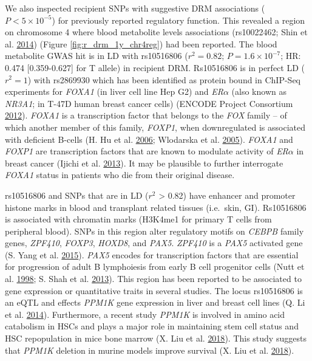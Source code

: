 \documentclass[]{DissertateOSU}
\begin{document}
We also inspected recipient SNPs with suggestive DRM associations
(\(P < 5\times{10}^{-5}\)) for previously reported regulatory function.
This revealed a region on chromosome 4 where blood metabolite levels
associations (rs10022462; Shin et al.
\protect\hyperlink{ref-shin_2014}{2014}) (Figure
\ref{fig:r_drm_1y_chr4reg}) had been reported. The blood metabolite GWAS
hit is in LD with rs10516806 (\(r^{2} = 0.82\);
\(P=1.6\times{10}^{-7}\); HR: 0.474 {[}0.359-0.627{]} for T allele) in
recipient DRM. Rs10516806 is in perfect LD (\(r^2=1\)) with rs2869930
which has been identified as protein bound in ChIP-Seq experiments for
\emph{FOXA1} (in liver cell line Hep G2) and \textit{ER$\alpha$} (also
known as \emph{NR3A1}; in T-47D human breast cancer cells) (ENCODE
Project Consortium \protect\hyperlink{ref-encode_2012}{2012}).
\emph{FOXA1} is a transcription factor that belongs to the \emph{FOX}
family -- of which another member of this family, \emph{FOXP1}, when
downregulated is associated with deficient B-cells (H. Hu et al.
\protect\hyperlink{ref-hu_2006}{2006}; Wlodarska et al.
\protect\hyperlink{ref-Wlodarska_2005}{2005}). \emph{FOXA1} and
\emph{FOXP1} are transcription factors that are known to modulate
activity of \textit{ER$\alpha$} in breast cancer (Ijichi et al.
\protect\hyperlink{ref-Ijichi_2013}{2013}). It may be plausible to
further interrogate \emph{FOXA1} status in patients who die from their
original disease.

rs10516806 and SNPs that are in LD (\(r^2\) \textgreater{} 0.82) have
enhancer and promoter histone marks in blood and transplant related
tissues (i.e.~skin, GI). Rs10516806 is associated with chromatin marks
(H3K4me1 for primary T cells from peripheral blood). SNPs in this region
alter regulatory motifs on \emph{CEBPB} family genes, \emph{ZPF410},
\emph{FOXP3}, \emph{HOXD8}, and \emph{PAX5}. \emph{ZPF410} is a
\emph{PAX5} activated gene (S. Yang et al.
\protect\hyperlink{ref-yang_2015}{2015}). \emph{PAX5} encodes for
transcription factors that are essential for progression of adult B
lymphoiesis from early B cell progenitor cells (Nutt et al.
\protect\hyperlink{ref-nutt_1998}{1998}; S. Shah et al.
\protect\hyperlink{ref-shah_2013}{2013}). This region has been reported
to be associated to gene expression or quantitative traits in several
studies. The locus rs10516806 is an eQTL and effects \emph{PPM1K} gene
expression in liver and breast cell lines (Q. Li et al.
\protect\hyperlink{ref-li_2014}{2014}). Furthermore, a recent study
\emph{PPM1K} is involved in amino acid catabolism in HSCs and plays a
major role in maintaining stem cell status and HSC repopulation in mice
bone marrow (X. Liu et al. \protect\hyperlink{ref-Liu_2018}{2018}). This
study suggests that \emph{PPM1K} deletion in murine models improve
survival (X. Liu et al. \protect\hyperlink{ref-Liu_2018}{2018}).
\end{document}
